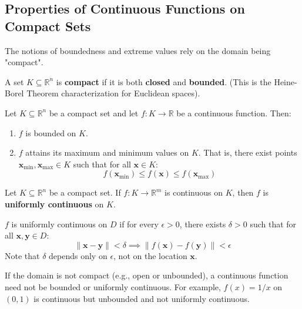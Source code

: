 \documentclass[oneside]{book}
\begin{document}
\subsection{Properties of Continuous Functions on Compact Sets}

The notions of boundedness and extreme values rely on the domain being "compact".

\begin{definition}
A set $K \subseteq \mathbb{R}^n$ is \textbf{compact} if it is both \textbf{closed} and \textbf{bounded}.
(This is the Heine-Borel Theorem characterization for Euclidean spaces).
\end{definition}

\begin{theorem}
Let $K \subseteq \mathbb{R}^n$ be a compact set and let $f: K \to \mathbb{R}$ be a continuous function. Then:
\begin{enumerate}
    \item $f$ is bounded on $K$.
    \item $f$ attains its maximum and minimum values on $K$. That is, there exist points $\mathbf{x}_{\min}, \mathbf{x}_{\max} \in K$ such that for all $\mathbf{x} \in K$:
    \[ f(\mathbf{x}_{\min}) \le f(\mathbf{x}) \le f(\mathbf{x}_{\max}) \]
\end{enumerate}
\end{theorem}

\begin{theorem}
Let $K \subseteq \mathbb{R}^n$ be a compact set. If $f: K \to \mathbb{R}^m$ is continuous on $K$, then $f$ is \textbf{uniformly continuous} on $K$.
\end{theorem}

\begin{definition}
$f$ is uniformly continuous on $D$ if for every $\epsilon > 0$, there exists $\delta > 0$ such that for all $\mathbf{x}, \mathbf{y} \in D$:
\[ \|\mathbf{x} - \mathbf{y}\| < \delta \implies \|f(\mathbf{x}) - f(\mathbf{y})\| < \epsilon \]
Note that $\delta$ depends only on $\epsilon$, not on the location $\mathbf{x}$.
\end{definition}

\begin{remark}
If the domain is not compact (e.g., open or unbounded), a continuous function need not be bounded or uniformly continuous.
For example, $f(x) = 1/x$ on $(0, 1)$ is continuous but unbounded and not uniformly continuous.
\end{remark}
\end{document}
